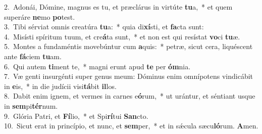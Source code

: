 {2.~}Adonái, Dómine, magnus es tu, et præclárus in virtúte \textbf{tu}a,~* et quem superáre \textbf{ne}mo \textbf{po}test.\\
{3.~}Tibi sérviat omnis creatúra \textbf{tu}a:~* quia di\textbf{xí}sti, et \textbf{fa}cta sunt:\\
{4.~}Misísti spíritum tuum, et cre\textbf{á}ta sunt,~* et non est qui resístat \textbf{vo}ci \textbf{tu}æ.\\
{5.~}Montes a fundaméntis movebúntur cum \textbf{a}quis:~* petræ, sicut cera, liquéscent ante \textbf{fá}ciem \textbf{tu}am.\\
{6.~}Qui autem \textbf{ti}ment te,~* magni erunt apud \textbf{te} per \textbf{óm}nia.\\
{7.~}Væ genti insurgénti super genus meum: Dóminus enim omnípotens vindicábit in \textbf{e}is,~* in die judícii visi\textbf{tá}bit \textbf{il}los.\\
{8.~}Dabit enim ignem, et vermes in carnes e\textbf{ó}rum,~* ut urántur, et séntiant usque in \textbf{sem}pi\textbf{tér}num.\\
{9.~}Glória Patri, et \textbf{Fí}lio,~* et Spi\textbf{rí}tui \textbf{San}cto.\\
{10.~}Sicut erat in princípio, et nunc, et \textbf{sem}per,~* et in sǽcula sæcu\textbf{ló}rum. \textbf{A}men.\\
